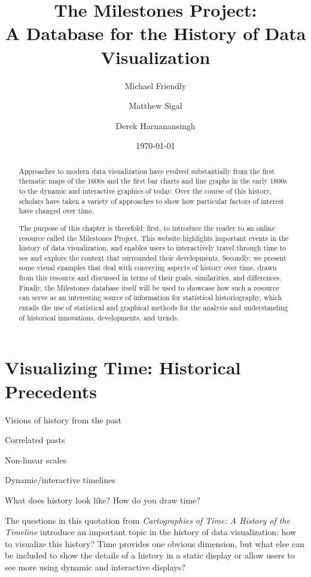 \documentclass[11pt]{article}
\begin{document}
\title{The Milestones Project: \\ A Database for the History of Data Visualization}
\author{Michael Friendly \and Matthew Sigal \and Derek Harnanansingh}
\date{\today}

\maketitle

\begin{abstract}
Approaches to modern data visualization have evolved substantially from the first thematic maps of the 1600s and the
first bar charts and line graphs
in the early 1800s to the dynamic and interactive graphics of today.
Over the course of this history, scholars have taken a variety of approaches to show how particular factors of interest have changed over time.

The purpose of this chapter is threefold: first, to introduce the reader to an online resource called the Milestones Project. This website highlights important events in the history of data visualization, and enables users to interactively travel through time to see and explore
the context that surrounded their developments. Secondly, we present some visual
examples that
deal with conveying aspects of history
over time, drawn from this resource and discussed in terms of their goals, similarities, and differences.
Finally, the Milestones database itself will be used to showcase how such a resource can serve as an interesting source of information for statistical historiography, which entails the use of statistical and graphical methods for the analysis and understanding of historical innovations, developments, and trends.
\end{abstract}





\section{Visualizing Time: Historical Precedents}\label{sec:vistime}
\begin{itemize*}
  \item Visions of history from the past
  \item Correlated pasts
  \item Non-linear scales
  \item Dynamic/interactive timelines
\end{itemize*}

\epigraph{What does history look like?  How do you draw time?}{\citet[p. 10]{RosenbergGrafton:2010}}
The questions in this quotation from \emph{Cartographies of Time: A History of the Timeline} \citet{RosenbergGrafton:2010}
introduce an important topic in the history of data visualization: how to visualize this history?
Time provides one obvious dimension, but what else can be included to show the details of a history in a static display
or allow users to see more using dynamic and interactive displays?
\end{document}
